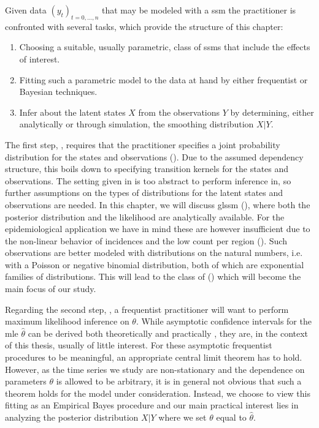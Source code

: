 Given data $(y_t)_{t = 0, \dots, n}$ that may be modeled with a \gls{ssm} the practitioner is confronted with several tasks, which provide the structure of this chapter:

\begin{enumerate}
    \item\label{it:model_choice} Choosing a suitable, usually parametric, class of \glspl{ssm} that include the effects of interest.
    \item\label{it:model_fitting} Fitting such a parametric model to the data at hand by either frequentist or Bayesian techniques.
    \item\label{it:smoothing_problem} Infer about the latent states $X$ from the observations $Y$ by determining, either analytically or through simulation, the smoothing distribution $X|Y$.
\end{enumerate}

The first step, , requires that the practitioner specifies a joint probability distribution for the states and observations ().
Due to the assumed dependency structure, this boils down to specifying transition kernels for the states and observations.
The setting given in  is too abstract to perform inference in, so further assumptions on the types of distributions for the latent states and observations are needed.
In this chapter, we will discuss \gls{glssm}  (), where both the posterior distribution and the likelihood are analytically available. For the epidemiological application we have in mind these are however insufficient due to the non-linear behavior of incidences and the low count per region ().
Such observations are better modeled with distributions on the natural numbers, i.e. with a Poisson or negative binomial distribution, both of which are exponential families of distributions. This will lead to the class of  () which will become the main focus of our study.

Regarding the second step, , a frequentist practitioner will want to perform maximum likelihood inference on $\theta$.
While asymptotic confidence intervals for the \gls{mle} $\hat\theta$ can be derived both theoretically and practically \citep[Chapter 7]{Durbin2012Time}, they are, in the context of this thesis, usually of little interest. For these asymptotic frequentist procedures to be meaningful, an appropriate central limit theorem has to hold. However, as the time series we study are non-stationary and the dependence on parameters $\theta$ is allowed to be arbitrary, it is in general not obvious that such a theorem holds for the model under consideration. Instead, we choose to view this fitting as an Empirical Bayes procedure and our main practical interest lies in analyzing the posterior distribution $X|Y$ where we set $\theta$ equal to $\hat\theta$. 


